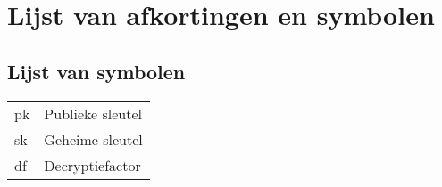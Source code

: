 \documentclass[master=elt,masteroption=im,inputenc=utf8]{kulemt}
\begin{document}
  

  \begin{preface}
  \end{preface}

  \kulemtmanToC
  \tableofcontents

  \begin{abstract}
  \end{abstract}
  
  \listoffiguresandtables
  
  \chapter{Lijst van afkortingen en symbolen}
  \section*{Lijst van symbolen}
  \begin{flushleft}
    \renewcommand{\arraystretch}{1.1}
    \begin{tabularx}{\textwidth}{@{}p{12mm}X@{}}
      pk & Publieke sleutel \\
      sk & Geheime sleutel \\
      df & Decryptiefactor
    \end{tabularx}
  \end{flushleft}

  \mainmatter

  
  
  
  
  
  
  
  
  
  
  

  \backmatter

  \nocite{*}

  
  
\end{document}
